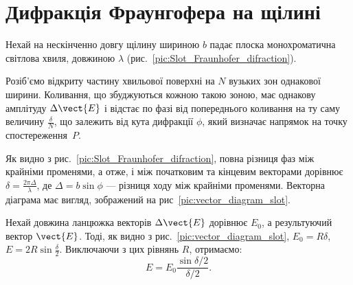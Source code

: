 \section{Дифракція Фраунгофера на щілині}

Нехай на нескінченно довгу щілину шириною $ b $ падає плоска монохроматична світлова хвиля, довжиною $ \lambda $  (рис.~\ref{pic:Slot_Fraunhofer_difraction}).




Розіб'ємо відкриту частину хвильової поверхні на $  N $ вузьких зон однакової ширини. Коливання, що збуджуються кожною такою зоною, має однакову амплітуду $ \Delta \vect{E} $ і відстає по фазі від попереднього коливання на ту саму величину $ \frac{\delta}{N} $, що залежить від кута дифракції $ \phi $, який визначає напрямок на точку спостереження~$ P $.




Як видно з рис.~\ref{pic:Slot_Fraunhofer_difraction}, повна різниця фаз між крайніми променями, а отже, і між початковим та кінцевим векторами дорівнює $ \delta = \frac{2\pi \Delta}{\lambda} $, де $ \Delta = b\sin\phi $ --- різниця ходу між крайніми променями. Векторна діаграма має вигляд, зображений на рис~\ref{pic:vector_diagram_slot}.

\begin{figure}[h!]\centering
    
\end{figure}



Нехай довжина ланцюжка векторів $ \Delta \vect{E} $ дорівнює $ E_0 $, а результуючий вектор $ \vect{E} $. Тоді, як видно з рис.~\ref{pic:vector_diagram_slot}, $ E_0 = R\delta $, $ E = 2R\sin\frac\delta2 $. Виключаючи з цих рівнянь $ R $, отримаємо:
\begin{equation}\label{eq:Difraction_E_slot}
    E = E_0 \frac{\sin\delta/2}{\delta/2}.
\end{equation}

